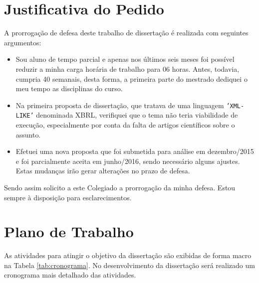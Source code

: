 \documentclass[10pt,a4paper]{report}
\begin{document}
\section{Justificativa do Pedido}
\label{justificativa}

A prorrogação de defesa deste trabalho de dissertação é realizada com seguintes argumentos:

\begin{itemize}
	\item Sou aluno de tempo parcial e apenas nos últimos seis meses foi possível	reduzir a minha carga horária de trabalho para 06 horas. Antes, todavia, cumpria 40 semanais, desta forma, a primeira parte do 
	mestrado dediquei o meu tempo as disciplinas do curso. 
	\item  Na primeira proposta de dissertação, que tratava de uma linguagem
	\texttt{'XML-LIKE'} denominada XBRL, verifiquei que o tema não teria viabilidade de
	execução, especialmente por conta da falta de artigos 
	científicos sobre o assunto. 
	\item Efetuei uma nova proposta que foi submetida para análise em dezembro/2015 e foi parcialmente aceita em junho/2016, sendo necessário alguns ajustes. Estas mudanças irão gerar alterações
	no prazo de defesa.
\end{itemize}

Sendo assim solicito a este Colegiado a prorrogação da minha defesa. Estou
sempre à disposição para esclarecimentos.

\section{Plano de Trabalho}
\label{Plano de Trabalho}
 As atividades para atingir o objetivo da dissertação são exibidas de forma macro na Tabela \ref{tab:cronograma}. No desenvolvimento da dissertação será realizado um cronograma mais detalhado das atividades.
\end{document}
